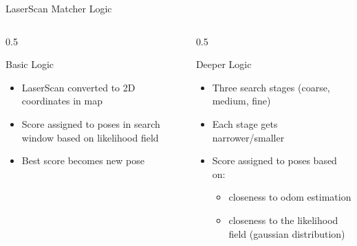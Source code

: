 \documentclass[aspectratio=169, 11pt]{beamer}
\begin{document}
\begin{frame}{LaserScan Matcher Logic}
  \begin{columns}[T]
    \begin{column}{0.5\textwidth}
      \begin{block}{Basic Logic}
          \begin{itemize}
            \item LaserScan converted to 2D coordinates in map
            \item Score assigned to poses in search window based on likelihood field
            \item Best score becomes new pose
          \end{itemize}
      \end{block}
    \end{column}
    
    \begin{column}{0.5\textwidth}
      \begin{block}{Deeper Logic}
          \begin{itemize}
            \item Three search stages (coarse, medium, fine)
            \item Each stage gets narrower/smaller
            \item Score assigned to poses based on:
              \begin{itemize}
                  \item closeness to odom estimation
                  \item closeness to the likelihood field (gaussian distribution)
              \end{itemize}
          \end{itemize}
      \end{block}
    \end{column}
  \end{columns}
\end{frame}
\end{document}

